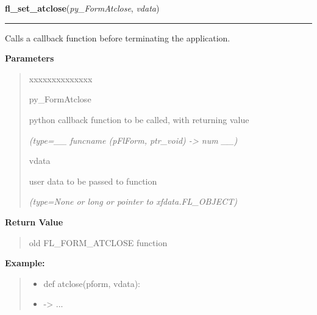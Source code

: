 \hspace{.8\funcindent}\begin{boxedminipage}{\funcwidth}

    \raggedright \textbf{fl\_set\_atclose}(\textit{py\_FormAtclose}, \textit{vdata})

    \vspace{-1.5ex}

    \rule{\textwidth}{0.5\fboxrule}
\setlength{\parskip}{2ex}
    Calls a callback function before terminating the application.

\setlength{\parskip}{1ex}
      \textbf{Parameters}
      \vspace{-1ex}

      \begin{quote}
        \begin{Ventry}{xxxxxxxxxxxxxx}

          \item[py\_FormAtclose]

          python callback function to be called, with returning value

            {\it (type=\_\_ funcname (pFlForm, ptr\_void) -{\textgreater} num \_\_)}

          \item[vdata]

          user data to be passed to function

            {\it (type=None or long or pointer to xfdata.FL\_OBJECT)}

        \end{Ventry}

      \end{quote}

      \textbf{Return Value}
    \vspace{-1ex}

      \begin{quote}
      old FL\_FORM\_ATCLOSE function

      \end{quote}

\textbf{Example:}
\begin{quote}
  \begin{itemize}

  \item
    \setlength{\parskip}{0.6ex}
def atclose(pform, vdata):



  \item {\textbar}-{\textgreater}{\textbar} ...




\end{itemize}
\end{quote}
\end{boxedminipage}
